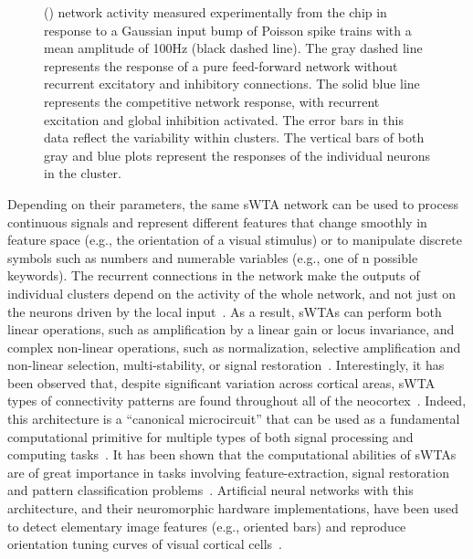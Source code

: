\begin{figure}[h]
{  () network activity measured experimentally from the chip in response to a Gaussian input bump of Poisson spike trains with a mean amplitude of 100Hz (black dashed line). The gray dashed line represents the response of a pure feed-forward network without recurrent excitatory and inhibitory connections. The solid blue line represents the competitive network response, with recurrent excitation and global inhibition activated. The error bars in this data reflect the variability within clusters. The vertical bars of both gray and blue plots represent the responses of the individual neurons in the cluster.}
\label{fig:bump_coupled}
\end{figure}

Depending on their parameters, the same \ac{sWTA} network can be used to process continuous signals and represent different features that change smoothly in feature space (e.g., the orientation of a visual stimulus) or to manipulate discrete symbols such as numbers and numerable variables (e.g., one of n possible keywords).
The recurrent connections in the network make the outputs of individual clusters depend on the activity of the whole network, and not just on the neurons driven by the local input~\cite{Douglas_etal95}.
As a result, \acp{sWTA} can perform both linear operations, such as amplification by a linear gain or locus invariance, and complex non-linear operations, such as normalization, selective amplification and non-linear selection, multi-stability, or signal restoration~\cite{Douglas_Martin07}.
Interestingly, it has been observed that, despite significant variation across cortical areas, \ac{sWTA} types of connectivity patterns are found throughout all of the neocortex~\cite{Douglas_etal89,Douglas_Martin04}.
Indeed, this architecture is a ``canonical microcircuit'' that can be used as a fundamental computational primitive for multiple types of both signal processing and computing tasks~\cite{Douglas_Martin07}.
It has been shown that the computational abilities of \acp{sWTA} are of great importance in tasks involving feature-extraction, signal restoration and pattern classification problems~\cite{Maass00}.
Artificial neural networks with this architecture, and their neuromorphic hardware implementations, have been used to detect elementary image features (e.g., oriented bars) and reproduce orientation tuning curves of visual cortical cells~\cite{Ben-Yishai_etal95,Somers_etal95,Chicca_etal07a}.

